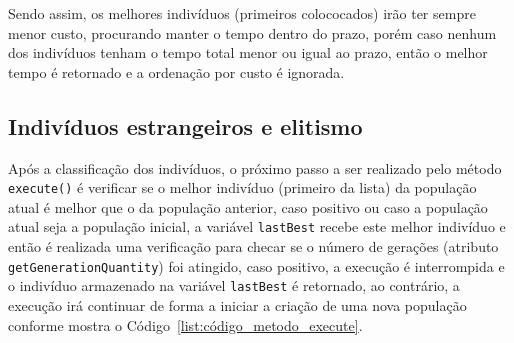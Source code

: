 \par Sendo assim, os melhores indivíduos (primeiros colococados) irão ter sempre menor custo, procurando manter o tempo dentro do prazo, porém caso nenhum dos indivíduos tenham o tempo total menor ou igual ao prazo, então o melhor tempo é retornado e a ordenação por custo é ignorada.

\subsection{Indivíduos estrangeiros e elitismo} \label{ind_estrangeiros_subsection}

\par Após a classificação dos indivíduos, o próximo passo a ser realizado pelo método \texttt{execute()} é verificar
se o melhor indivíduo (primeiro da lista) da população atual é melhor que o da população anterior, caso positivo ou
caso a população atual seja a população inicial, a variável \texttt{lastBest} recebe este melhor indivíduo e então é 
realizada uma verificação para checar se o número de gerações (atributo \texttt{getGenerationQuantity}) foi atingido, 
caso positivo, a execução é interrompida e o indivíduo armazenado na variável \texttt{lastBest} é retornado, ao contrário, 
a execução irá continuar de forma a iniciar a criação de uma nova população conforme mostra o Código~\ref{list:código_metodo_execute}.


